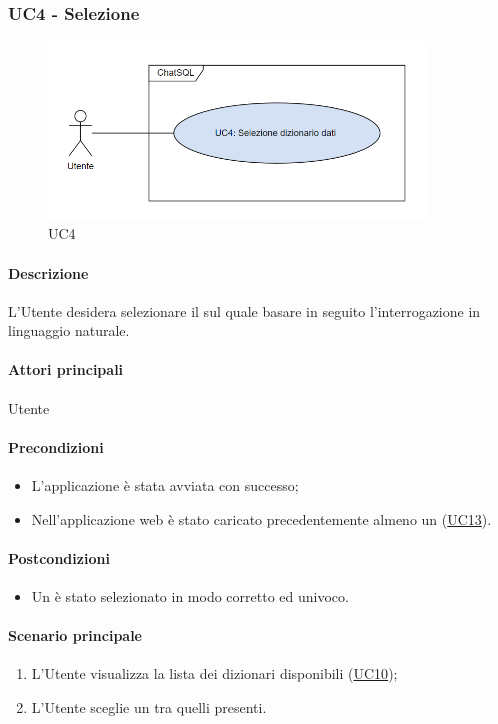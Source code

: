 \subsubsection{UC4 - Selezione }\label{UC4}

\begin{figure}[H]
  \centering
  \includegraphics[width=0.90\textwidth]{assets/uc4.png}
  \caption{UC4}
\end{figure}

\paragraph*{Descrizione}
L’Utente desidera selezionare il  sul quale basare in seguito l’interrogazione in linguaggio naturale.

\paragraph*{Attori principali}
Utente

\paragraph*{Precondizioni}
\begin{itemize}
  \item L'applicazione è stata avviata con successo;
  \item Nell'applicazione web è stato caricato precedentemente almeno un  (\hyperref[UC13]{UC13}).
\end{itemize}

\paragraph*{Postcondizioni}
\begin{itemize}
  \item Un  è stato selezionato in modo corretto ed univoco.
\end{itemize}

\paragraph*{Scenario principale}
\begin{enumerate}
  \item L’Utente visualizza la lista dei dizionari disponibili (\hyperref[UC10]{UC10});
  \item L'Utente sceglie un  tra quelli presenti.
\end{enumerate}

